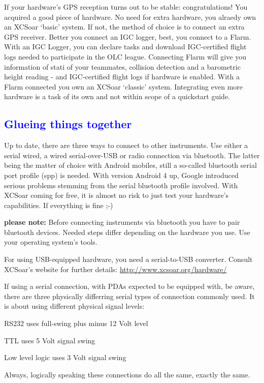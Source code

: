 If your hardware's GPS reception turns out to be stable: congratulations! You 
acquired a good piece of hardware. No need for extra hardware, you alraedy own 
an XCSoar `basic' system. If not, the method of choice is to connect an extra 
GPS receiver. Better you connect an IGC logger, best, you connect to a Flarm. 
With an IGC Logger, you can declare tasks and download IGC-certified flight 
logs needed to participate in the OLC league.
Connecting Flarm will give you information of stati of your teammates, 
collision detection and a barometric height reading - and IGC-certified flight 
logs if hardware is enabled.
With a Flarm connected you own an XCSoar `classic' system.  Integrating even 
more hardware is a task of its own and not within scope of a quickstart guide. 

\subsection*{\textcolor{blue}{Glueing things together}}
Up to date, there are three ways to connect to other instruments.  Use either 
a serial wired, a wired serial-over-USB or radio connection via bluetooth. The 
latter being the matter of choice with Android mobiles, still a so-called 
bluetooth serial port profile (spp) is needed. With version Android 4 up, 
Google introduced serious problems stemming from the serial bluetooth profile 
involved. With XCSoar coming for free, it is almost no risk to just test your 
hardware's capabilities. If everything is fine ;-)

\textbf{please note:} Before connecting instruments via bluetooth you have to 
pair bluetooth devices. Needed steps differ depending on the hardware you use. 
Use your operating system's tools.

For using USB-equipped hardware, you need a serial-to-USB converter. Consult 
XCSoar's website for further details: {\url{http://www.xcsoar.org/hardware/}}

If using a serial connection, with PDAs expected to be equipped with, be 
aware, there are three physically differring serial types of connection 
commonly used. It is about using different physical signal levels:

\begin{compactitem}
\item RS232 uses full-swing plus minus 12 Volt level
\item TTL uses 5 Volt signal swing
\item Low level logic uses 3 Volt signal swing
\end{compactitem}
Always, logically speaking these connections do all the same, exactly the 
same.

